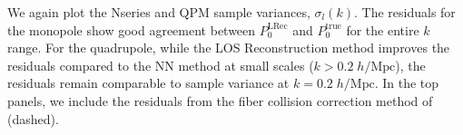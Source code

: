 \begin{figure*}
\begin{center}
{                                                                                                                                                                                                                                                                         We again plot the Nseries and QPM sample variances, $\sigma_l(k)$.
                                                                                                                                                                                                                                                                         The residuals for the monopole show good agreement between 
                                                                                                                                                                                                                                                                         $P_0^\mathrm{LRec}$ and $P_0^\mathrm{true}$ for the entire $k$ range. 
                                                                                                                                                                                                                                                                         For the quadrupole, while the LOS Reconstruction method improves the residuals 
                                                                                                                                                                                                                                                                         compared to the NN method at small scales ($k > 0.2\;h/\mathrm{Mpc}$), 
                                                                                                                                                                                                                                                                         the residuals remain comparable to sample variance at $k=0.2\;h/\mathrm{Mpc}$.
                                                                                                                                                                                                                                                                         In the top panels, we include the residuals from the fiber collision 
                                                                                                                                                                                                                                                                         correction method of \cite{Gil-Marin:2014aa} (dashed). 
}
\end{center}
\end{figure*}
